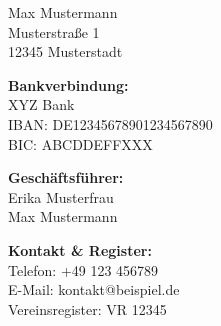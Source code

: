\documentclass[12pt,a4paper]{scrlttr2}
\begin{document}
\begin{letter}{Max Mustermann\\ Musterstraße 1\\ 12345 Musterstadt}
\vspace{1cm} %

\vfill %
\begin{multicols}{3}
{\small \color{gray}
\textbf{Bankverbindung:}\\
XYZ Bank\\
IBAN: DE12345678901234567890\\
BIC: ABCDDEFFXXX
}

\columnbreak

{\small \color{gray}
\textbf{Geschäftsführer:}\\
Erika Musterfrau\\
Max Mustermann
}

\columnbreak

{\small \color{gray}
\textbf{Kontakt & Register:}\\
Telefon: +49 123 456789\\
E-Mail: kontakt@beispiel.de\\
Vereinsregister: VR 12345
}
\end{multicols}

\end{letter}
\end{document}
